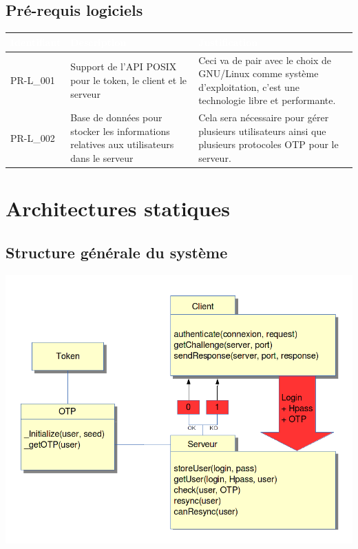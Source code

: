 \documentclass{"../../res/univ-projet"}
\begin{document}
\subsection{Pré-requis logiciels}
\begin{tabular}{|p{}|p{}|p{}|}
    \hline
    \rowcolor{gray}
    \textcolor{white}{\bfseries Identifiant} & 
    \textcolor{white}{\bfseries Description} &
    \textcolor{white}{\bfseries Justification} \\
    \hline
    PR-L\_001 &
    Support de l'API POSIX pour le token, le client et le serveur &
    Ceci va de pair avec le choix de GNU/Linux comme système d'exploitation,
    c'est une technologie libre et performante.\\
    \hline
    PR-L\_002 &
    Base de donn\'ees pour stocker les informations relatives aux utilisateurs dans le serveur&
    Cela sera n\'ecessaire pour g\'erer plusieurs utilisateurs ainsi que plusieurs protocoles
    OTP pour le serveur.\\
    \hline
\end{tabular}


\section{Architectures statiques}
\subsection{Structure g\'en\'erale du syst\`eme}
\includegraphics[width=\textwidth]{../graphics/architecture.png}
\end{document}
